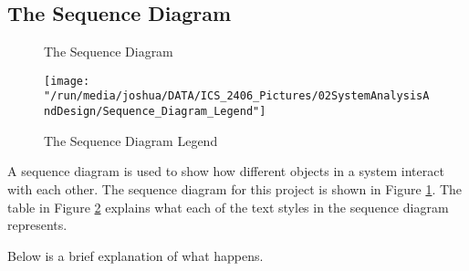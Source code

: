 \documentclass[12pt,svgnames,smaller]{article} %
\begin{document}
							
	
	\clearpage
	\subsection{The Sequence Diagram}
	\begin{figure}
		\centering
		\caption{The Sequence Diagram}
		\label{fig:SystemAnalysisandDesign-Sequence_Diagram}
	\end{figure}%
	\begin{figure}
		\centering
		\texttt{[image: "/run/media/joshua/DATA/ICS\_2406\_Pictures/02SystemAnalysisAndDesign/Sequence\_Diagram\_Legend"]}
		\caption{The Sequence Diagram Legend}
		\label{fig:SystemAnalysisandDesign-Sequence_Diagram_Legend}
	\end{figure}
	
	A sequence diagram is used to show how different objects in a system interact with each other. The sequence diagram for this project is shown in Figure \ref{fig:SystemAnalysisandDesign-Sequence_Diagram}.	The table in Figure \ref{fig:SystemAnalysisandDesign-Sequence_Diagram_Legend} explains what each of the text styles in the sequence diagram represents.
	
	Below is a brief explanation of what happens.
	
\end{document}
